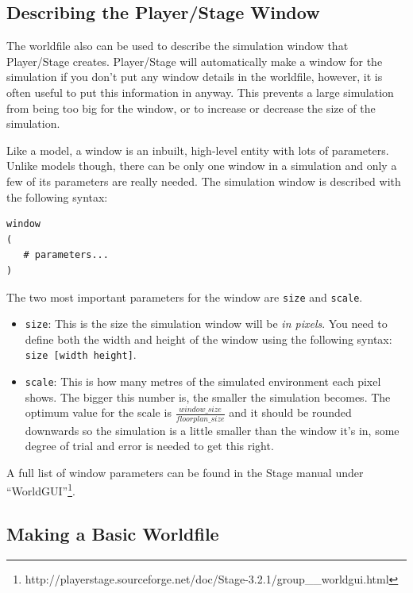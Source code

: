 \documentclass[a4paper]{report}
\newcommand{\plst}{Player/Stage\xspace}
\begin{document}
\subsection{Describing the \plst Window}

The worldfile also can be used to describe the simulation window that \plst creates. \plst will automatically make a window for the simulation if you don't put any window details in the worldfile, however, it is often useful to put this information in anyway. This prevents a large simulation from being too big for the window, or to increase or decrease the size of the simulation.

Like a model, a window is an inbuilt, high-level entity with lots of parameters. Unlike models though, there can be only one window in a simulation and only a few of its parameters are really needed. The simulation window is described with the following syntax:
\begin{verbatim}
window
(
   # parameters...
)
\end{verbatim}

The two most important parameters for the window are \verb|size| and \verb|scale|.
\begin{itemize}
\item \verb|size|: This is the size the simulation window will be \emph{in pixels}. You need to define both the width and height of the window using the following syntax: \verb|size [width height]|. 
\item \verb|scale|: This is how many metres of the simulated environment each pixel shows. The bigger this number is, the smaller the simulation becomes. The optimum value for the scale is $\frac{window\_size}{floorplan\_size}$ and it should be rounded downwards so the simulation is a little smaller than the window it's in, some degree of trial and error is needed to get this right. 
\end{itemize}

A full list of window parameters can be found in the Stage manual under ``WorldGUI''\footnote{http://playerstage.sourceforge.net/doc/Stage-3.2.1/group\_\_worldgui.html}.

\subsection{Making a Basic Worldfile}\label{sec:basicWorldfile}
\end{document}
